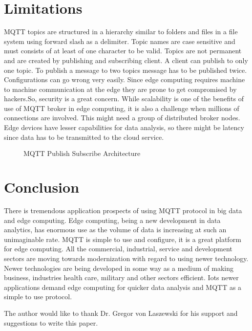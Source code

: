 \documentclass[sigconf]{acmart}
\begin{document}
\section{Limitations}

MQTT topics are structured in a hierarchy similar to folders and files in a file system using forward slash as a delimiter. Topic names are case sensitive and must consists of at least of one character to be valid.
Topics are not permanent and are created by publishing and subscribing client.
A client can publish to only one topic.
To publish a message to two topics message has to be published twice.
Configurations can go wrong very easily. Since edge computing requires machine to machine communication at the edge they are prone to get compromised by hackers.So, security is a great concern. While scalability is one of the benefits of use of MQTT broker in edge computing, it is also a challenge when millions of connections are involved. This might need a group of distributed broker nodes. Edge devices have lesser capabilities for data analysis, so there might be latency since data has to be transmitted to the cloud service. 



\begin{figure}[htb]
\caption{MQTT Publish Subscribe Architecture}




\end{figure}



\section{Conclusion}
There is tremendous application prospects of using MQTT protocol in big data and edge computing. Edge computing, being a new  development in data analytics,  has enormous use as the volume of data is increasing at such an unimaginable rate. MQTT is simple to use and configure, it is a great platform for edge computing. All the commercial, industrial, service and development sectors are moving towards modernization with regard to using newer technology. Newer technologies are being developed in some way as a medium of making business, industries health care, military and other sectors efficient. Iots newer applications demand edge computing for quicker data analysis and MQTT as a simple to use protocol.  


\begin{acks}

  The author would like to thank Dr. Gregor von Laszewski for his
  support and suggestions to write this paper.

\end{acks}


 
\end{document}
